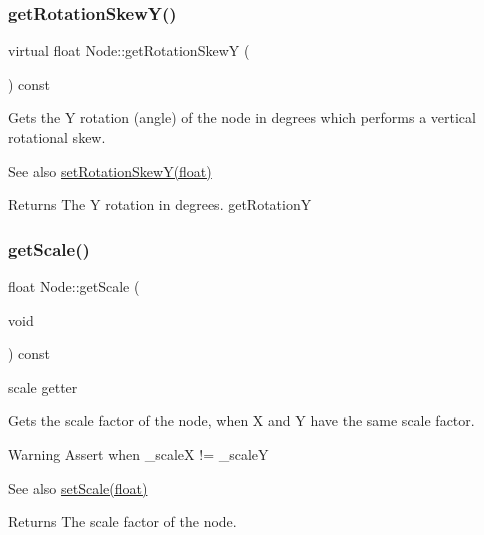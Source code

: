 \subsubsection{\texorpdfstring{get\+Rotation\+Skew\+Y()}{getRotationSkewY()}\hspace{0.1cm}{\footnotesize\ttfamily [2/2]}}
{\footnotesize\ttfamily virtual float Node\+::get\+Rotation\+SkewY (\begin{DoxyParamCaption}{ }\end{DoxyParamCaption}) const\hspace{0.3cm}{\ttfamily [virtual]}}

Gets the Y rotation (angle) of the node in degrees which performs a vertical rotational skew.

\begin{DoxySeeAlso}{See also}
{\ttfamily \hyperlink{classNode_a901c5fbd2327fbd6fd14771fd45d71af}{set\+Rotation\+Skew\+Y(float)}}
\end{DoxySeeAlso}
\begin{DoxyReturn}{Returns}
The Y rotation in degrees.  get\+RotationY 
\end{DoxyReturn}
\mbox{\label{classNode_ac9926440d4edab1020d348a2b950307c}} 
\subsubsection{\texorpdfstring{get\+Scale()}{getScale()}\hspace{0.1cm}{\footnotesize\ttfamily [1/2]}}
{\footnotesize\ttfamily float Node\+::get\+Scale (\begin{DoxyParamCaption}\item[{void}]{ }\end{DoxyParamCaption}) const\hspace{0.3cm}{\ttfamily [virtual]}}



scale getter 

Gets the scale factor of the node, when X and Y have the same scale factor.

\begin{DoxyWarning}{Warning}
Assert when {\ttfamily \+\_\+scaleX != \+\_\+scaleY} 
\end{DoxyWarning}
\begin{DoxySeeAlso}{See also}
\hyperlink{classNode_acf0955a52f51a9d6c8b0c9267b1e8668}{set\+Scale(float)}
\end{DoxySeeAlso}
\begin{DoxyReturn}{Returns}
The scale factor of the node. 
\end{DoxyReturn}


